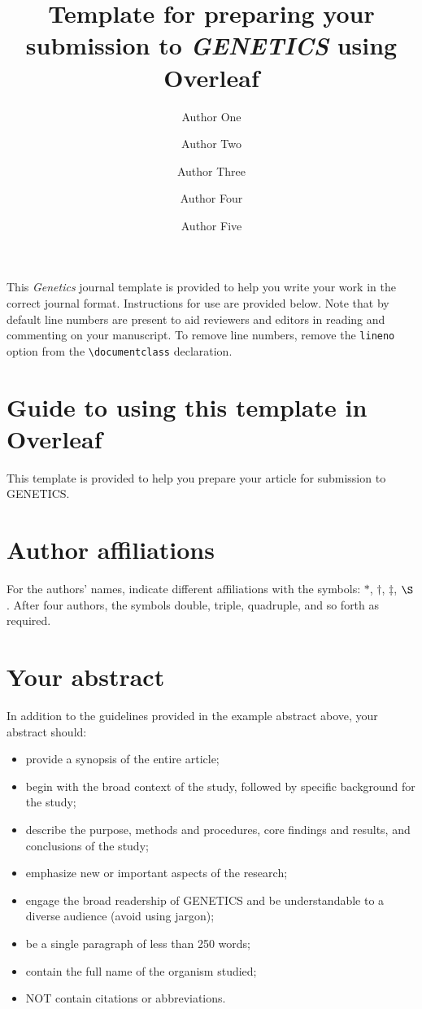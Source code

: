 \documentclass[9pt,twocolumn,twoside,lineno]{gsajnl}
\title{Template for preparing your submission to \textit{GENETICS} using Overleaf}
\author[1,$\dagger$]{Author One}
\author[1]{Author Two}
\author[2]{Author Three}
\author[2,3]{Author Four}
\author[4,$\ast$]{Author Five}
\affil[1]{Author one affiliation}
\affil[2]{Author two affiliation}
\affil[3]{Author three affiliation}
\affil[4]{Author four affiliation}
\affil[$\dagger$]{These authors contributed equally to this work.}
\begin{document}
\maketitle
\thispagestyle{firststyle}
\vspace{-13pt}%

\lettrine[lines=2]{\color{color2}T}{}his \textit{Genetics} journal template is provided to help you write your work in the correct journal format. Instructions for use are provided below. Note that by default line numbers are present to aid reviewers and editors in reading and commenting on your manuscript. To remove line numbers, remove the \texttt{lineno} option from the \verb|\documentclass| declaration.


\section{Guide to using this template in Overleaf}

This template is provided to help you prepare your article for submission to GENETICS.

\section{Author affiliations}

For the authors' names, indicate different affiliations with the symbols: $\ast$, $\dagger$, $\ddagger$, $\S$. After four authors, the symbols double, triple, quadruple, and so forth as required.

\section{Your abstract}

In addition to the guidelines provided in the example abstract above, your abstract should:

\begin{itemize}
\item provide a synopsis of the entire article;
\item begin with the broad context of the study, followed by specific background for the study;
\item describe the purpose, methods and procedures, core findings and results, and conclusions of the study;
\item emphasize new or important aspects of the research;
\item engage the broad readership of GENETICS and be understandable to a diverse audience (avoid using jargon);
\item be a single paragraph of less than 250 words;
\item contain the full name of the organism studied;
\item NOT contain citations or abbreviations.
\end{itemize}
\end{document}
